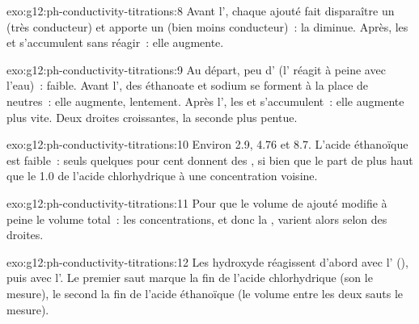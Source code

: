 \begin{solution}{exo:g12:ph-conductivity-titrations:8}
Avant l', chaque   ajouté fait disparaître un 
 (très conducteur) et apporte un   (bien moins
conducteur)~: la  diminue. Après, les   et
 s'accumulent sans réagir~: elle augmente.
\end{solution}

\begin{solution}{exo:g12:ph-conductivity-titrations:9}
Au départ, peu d' (l' réagit à peine avec l'eau)~:
 faible. Avant l', des  éthanoate et sodium
se forment à la place de  neutres~: elle augmente, lentement.
Après l', les   et  s'accumulent~: elle
augmente plus vite. Deux droites croissantes, la seconde plus pentue.
\end{solution}

\begin{solution}{exo:g12:ph-conductivity-titrations:10}
Environ 2.9, 4.76 et 8.7. L'acide éthanoïque est faible~: seuls quelques
pour cent donnent des , si bien que le  part de plus haut
que le 1.0 de l'acide chlorhydrique à une concentration voisine.
\end{solution}

\begin{solution}{exo:g12:ph-conductivity-titrations:11}
Pour que le volume de  ajouté modifie à peine le volume
total~: les concentrations, et donc la , varient alors selon
des droites.
\end{solution}

\begin{solution}{exo:g12:ph-conductivity-titrations:12}
Les  hydroxyde réagissent d'abord avec l' (),
puis avec l'. Le premier saut marque la fin de l'acide
chlorhydrique (son  le mesure), le second la fin
de l'acide éthanoïque (le volume entre les deux sauts le mesure).
\end{solution}

